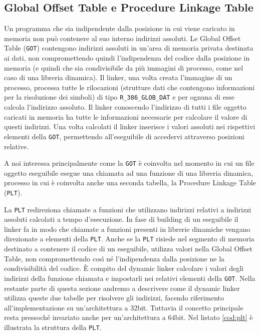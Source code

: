 \subsection{Global Offset Table e Procedure Linkage Table}
\label{sec:got}

Un programma che sia indipendente dalla posizione in cui viene
caricato in memoria non può contenere al suo interno indirizzi
assoluti. Le Global Offset Table (\lstinline{GOT}) contengono
indirizzi assoluti in un'area di memoria privata destinata ai dati,
non compromettendo quindi l'indipendenza del codice dalla posizione in
memoria (e quindi che sia condivisibile da più immagini di processo,
come nel caso di una libreria dinamica). Il linker, una volta creata
l'immagine di un processo, processa tutte le rilocazioni (strutture
dati che contengono informazioni per la risoluzione dei simboli) di
tipo \lstinline{R_386_GLOB_DAT} e per ognuna di esse calcola
l'indirizzo assoluto. Il linker conoscendo l'indirizzo di tutti i file
oggetto caricati in memoria ha tutte le informazioni necessarie per
calcolare il valore di questi indirizzi. Una volta calcolati il linker
inserisce i valori assoluti nei rispettivi elementi della
\lstinline{GOT}, permettendo all'eseguibile di accedervi attraverso
posizioni relative.

A noi interessa principalmente come la \lstinline{GOT} è coinvolta nel
momento in cui un file oggetto eseguibile esegue una chiamata ad una
funzione di una libreria dinamica, processo in cui è coinvolta anche
una seconda tabella, la Procedure Linkage Table (\lstinline{PLT}).

La \lstinline{PLT} redireziona chiamate a funzioni che utilizzano
indirizzi relativi a indirizzi assoluti calcolati a tempo
d'esecuzione. In fase di building di un eseguibile il linker fa in
modo che chiamate a funzioni presenti in librerie dinamiche vengano
direzionate a elementi della \lstinline{PLT}. Anche se la
\lstinline{PLT} risiede nel segmento di memoria destinato a contenere
il codice di un eseguibile, utilizza valori nella Global Offset Table,
non compromettendo così né l'indipendenza dalla posizione ne la
condivisibilità del codice. È compito del dynamic linker calcolare i
valori degli indirizzi della funzione chiamata e impostarli nei
relativi elementi della \lstinline{GOT}. Nella restante parte di
questa sezione andremo a descrivere come il dynamic linker utilizza
queste due tabelle per risolvere gli indirizzi, facendo riferimento
all'implementazione su un'architettura a 32bit. Tuttavia il concetto
principale resta pressoché invariato anche per un'architettura a
64bit. Nel listato \ref{cod:plt} è illustrata la struttura della \lstinline{PLT}.

